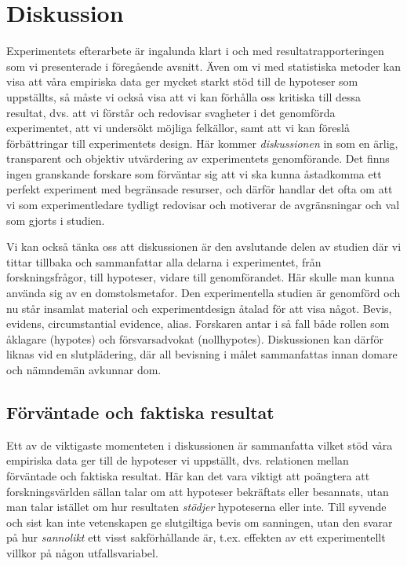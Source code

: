 \documentclass[
]{book}
\begin{document}
\hypertarget{sec08.2}{%
\section{Diskussion}\label{sec08.2}}

Experimentets efterarbete är ingalunda klart i och med resultatrapporteringen som vi presenterade i föregående avsnitt. Även om vi med statistiska metoder kan visa att våra empiriska data ger mycket starkt stöd till de hypoteser som uppställts, så måste vi också visa att vi kan förhålla oss kritiska till dessa resultat, dvs. att vi förstår och redovisar svagheter i det genomförda experimentet, att vi undersökt möjliga felkällor, samt att vi kan föreslå förbättringar till experimentets design. Här kommer \emph{diskussionen} in som en ärlig, transparent och objektiv utvärdering av experimentets genomförande. Det finns ingen granskande forskare som förväntar sig att vi ska kunna åstadkomma ett perfekt experiment med begränsade resurser, och därför handlar det ofta om att vi som experimentledare tydligt redovisar och motiverar de avgränsningar och val som gjorts i studien.

Vi kan också tänka oss att diskussionen är den avslutande delen av studien där vi tittar tillbaka och sammanfattar alla delarna i experimentet, från forskningsfrågor, till hypoteser, vidare till genomförandet. Här skulle man kunna använda sig av en domstolsmetafor. Den experimentella studien är genomförd och nu står insamlat material och experimentdesign åtalad för att visa något. Bevis, evidens, circumstantial evidence, alias. Forskaren antar i så fall både rollen som åklagare (hypotes) och försvarsadvokat (nollhypotes). Diskussionen kan därför liknas vid en slutplädering, där all bevisning i målet sammanfattas innan domare och nämndemän avkunnar dom.

\hypertarget{sub08.2.1}{%
\subsection{Förväntade och faktiska resultat}\label{sub08.2.1}}

Ett av de viktigaste momenteten i diskussionen är sammanfatta vilket stöd våra empiriska data ger till de hypoteser vi uppställt, dvs. relationen mellan förväntade och faktiska resultat. Här kan det vara viktigt att poängtera att forskningsvärlden sällan talar om att hypoteser bekräftats eller besannats, utan man talar istället om hur resultaten \emph{stödjer} hypoteserna eller inte. Till syvende och sist kan inte vetenskapen ge slutgiltiga bevis om sanningen, utan den svarar på hur \emph{sannolikt} ett visst sakförhållande är, t.ex. effekten av ett experimentellt villkor på någon utfallsvariabel.
\end{document}
